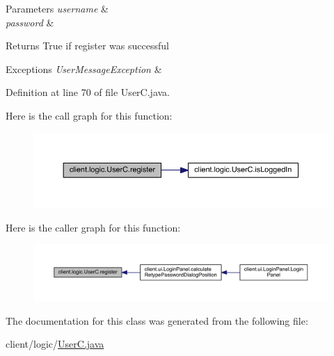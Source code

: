 \begin{DoxyParams}{Parameters}
{\em username} & \\
\hline
{\em password} & \\
\hline
\end{DoxyParams}
\begin{DoxyReturn}{Returns}
True if register was successful 
\end{DoxyReturn}

\begin{DoxyExceptions}{Exceptions}
{\em User\+Message\+Exception} & \\
\hline
\end{DoxyExceptions}


Definition at line 70 of file User\+C.\+java.

Here is the call graph for this function\+:
\nopagebreak
\begin{figure}[H]
\begin{center}
\leavevmode
\includegraphics[width=350pt]{classclient_1_1logic_1_1_user_c_a81ee75a5f1f4a278a71054a9c4f72609_cgraph}
\end{center}
\end{figure}
Here is the caller graph for this function\+:
\nopagebreak
\begin{figure}[H]
\begin{center}
\leavevmode
\includegraphics[width=350pt]{classclient_1_1logic_1_1_user_c_a81ee75a5f1f4a278a71054a9c4f72609_icgraph}
\end{center}
\end{figure}


The documentation for this class was generated from the following file\+:\begin{DoxyCompactItemize}
\item 
client/logic/\hyperlink{_user_c_8java}{User\+C.\+java}\end{DoxyCompactItemize}
